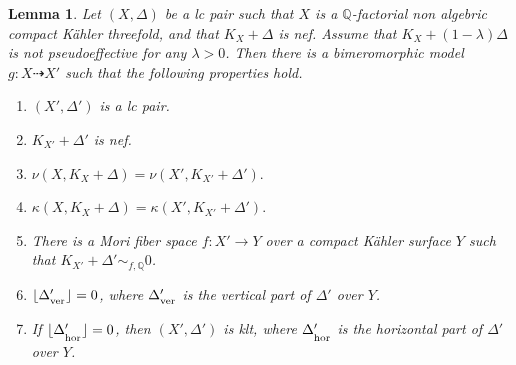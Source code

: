 \documentclass[12pt]{amsart}
\newcommand{\mbQ}{\mathbb{Q}}
\newcommand{\<}{\leq}
\newcommand{\D}{\Delta}
\newtheorem{lemma}[theorem]{Lemma}
\theoremstyle{remark}
\theoremstyle{definition}
\theoremstyle{definition}
\numberwithin{equation}{section}
\theoremstyle{definition}
\theoremstyle{definition}
\def\hor{\operatorname{\hor}}
\def\ver{\operatorname{\ver}}
\def\ver{\operatorname{\textsubscript{\rm ver}}}
\def\hor{\operatorname{\textsubscript{\rm hor}}}
\begin{document}
\begin{lemma}
\label{lemma:reduction-2.2}
Let $(X,\Delta)$ be a lc pair such that $X$ is a $\mathbb{Q}$-factorial non algebric compact K\"ahler threefold, and that $K_X+\Delta$ is nef. 
Assume that  $K_X+(1-\lambda)\Delta$ is not pseudoeffective for any $\lambda>0$.
Then there is a bimeromorphic model $g\colon X \dashrightarrow X'$     such that the following properties hold. 
\begin{enumerate}
    \item $(X',  \Delta')$ is a lc  pair.
    \item $K_{X'} + \Delta'$  is nef.     
    \item $\nu(X, K_X+\Delta) = \nu(X', K_{X'}+\Delta').$
    \item $\kappa(X, K_X+\Delta) = \kappa(X', K_{X'}+\Delta').$
    \item There is a Mori fiber space $f\colon X'\to Y$ over a compact K\"ahler surface $Y$ 
          such that $K_{X'}+\Delta'\sim_{f,\mbQ} 0$. 
    \item  $\lfloor  \Delta'_{\ver} \rfloor = 0$, where $\Delta'_{\ver}$ is the vertical part of $\Delta'$ over $Y$. 
    \item  If  $\lfloor  \Delta'_{\hor} \rfloor = 0$, then $(X', \D')$ is klt, where $\Delta'_{\hor}$ is the horizontal part of $\Delta'$ over $Y$. 
\end{enumerate} 
\end{lemma}
\end{document}
